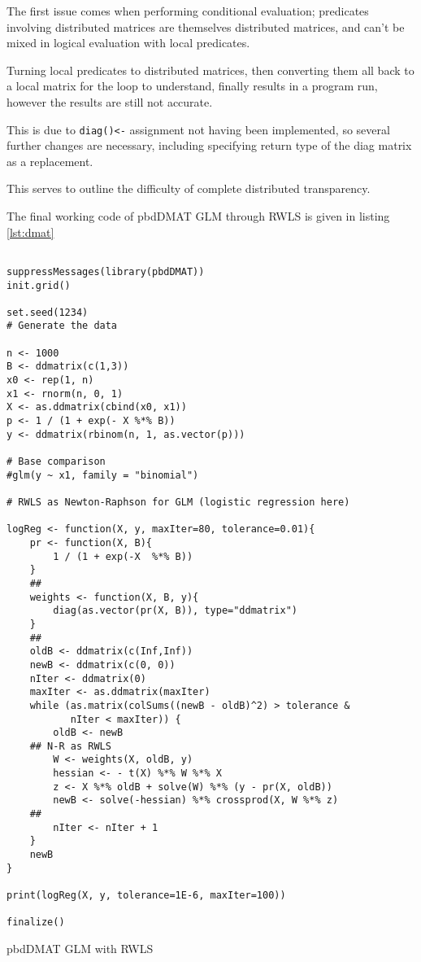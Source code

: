 The first issue comes when performing conditional evaluation; predicates
involving distributed matrices are themselves distributed matrices, and
can't be mixed in logical evaluation with local predicates.

Turning local predicates to distributed matrices, then converting them
all back to a local matrix for the loop to understand, finally results
in a program run, however the results are still not accurate.

This is due to
\texttt{diag()<-}
assignment not having been implemented, so several further changes are
necessary, including specifying return type of the diag matrix as a
replacement.

This serves to outline the difficulty of complete distributed
transparency.

The final working code of pbdDMAT GLM through RWLS is given in listing
\ref{lst:dmat}

\begin{listing}
	\begin{verbatim}

suppressMessages(library(pbdDMAT))
init.grid()

set.seed(1234)
# Generate the data

n <- 1000
B <- ddmatrix(c(1,3))
x0 <- rep(1, n)
x1 <- rnorm(n, 0, 1)
X <- as.ddmatrix(cbind(x0, x1))
p <- 1 / (1 + exp(- X %*% B))
y <- ddmatrix(rbinom(n, 1, as.vector(p)))

# Base comparison
#glm(y ~ x1, family = "binomial")

# RWLS as Newton-Raphson for GLM (logistic regression here)

logReg <- function(X, y, maxIter=80, tolerance=0.01){
	pr <- function(X, B){
		1 / (1 + exp(-X  %*% B))
	}
	##
	weights <- function(X, B, y){
		diag(as.vector(pr(X, B)), type="ddmatrix")
	}
	##
	oldB <- ddmatrix(c(Inf,Inf))
	newB <- ddmatrix(c(0, 0))
	nIter <- ddmatrix(0)
	maxIter <- as.ddmatrix(maxIter)
	while (as.matrix(colSums((newB - oldB)^2) > tolerance &
	       nIter < maxIter)) {
		oldB <- newB
	## N-R as RWLS
		W <- weights(X, oldB, y)
		hessian <- - t(X) %*% W %*% X
		z <- X %*% oldB + solve(W) %*% (y - pr(X, oldB))
		newB <- solve(-hessian) %*% crossprod(X, W %*% z)
	##
		nIter <- nIter + 1
	}
	newB
}

print(logReg(X, y, tolerance=1E-6, maxIter=100))

finalize()
\end{verbatim}
	\caption{pbdDMAT GLM with RWLS}
	\label{lst:dmat}
\end{listing}

